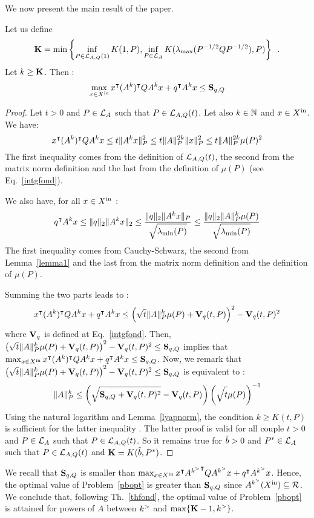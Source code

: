 \documentclass[10pt]{article}
\begin{document}
We now present the main result of the paper.
\begin{theorem}
\label{thfond}
Let us define \[\mathbf{K}=\min\left\{\inf_{P\in\mathcal{L}_{A,Q}(1)} K(1,P),\inf_{P\in\mathcal{L}_{A}} K(\lambda_{\operatorname{max}}(P^{-1/2}QP^{-1/2}),P)\right\}\enspace .\] Let $k\geq \mathbf{K}$. Then : 
\[
\max_{x\in X^\mathrm{in}} x^\intercal (A^k)^\intercal Q A^k x+q^\intercal A^k x\leq \mathbf{S}_{q,Q}
\]
\end{theorem}

\begin{proof}
Let $t>0$ and $P\in\mathcal{L}_{A}$ such that $P\in\mathcal{L}_{A,Q}(t)$. Let also $k\in\mathbb{N}$ and $x\in X^\mathrm{in}$. We have:
\[
x^\intercal (A^k)^\intercal Q A^k x  
\leq  t \| A^k x\|_P^2\leq t\| A\|^{2k}_P \| x\|^2_P
\leq t\| A\|_P^{2k} \mu(P)^2
\]
The first inequality comes from the definition of $\mathcal{L}_{A,Q}(t)$, the second from the matrix norm definition and the last from the definition of $\mu(P)$ (see Eq.~\eqref{intgfond}).

We also have, for all $x\in X^\mathrm{in}$ :
\[
q^\intercal A^k x
\leq \| q\|_2 \| A^k x\|_2\leq \dfrac{\| q\|_2 \| A^k x\|_P}{\sqrt{\strut \lambda_{\operatorname{min}}(P)}} 
\leq \dfrac{\| q\|_2\| A\|_P^{k} \mu(P)}{\sqrt{\strut \lambda_{\operatorname{min}}(P)}}
\]
The first inequality comes from Cauchy-Schwarz, the second from Lemma~\ref{lemma1} and the last from the matrix norm definition and the definition of $\mu(P)$. 

Summing the two parts leads to :
\[
x^\intercal (A^k)^\intercal Q A^k x+q^\intercal A^k x\leq \left(\sqrt{t}\| A\|_P^k\mu(P)+\mathbf{V}_{q}(t,P)\right)^2-\mathbf{V}_{q}(t,P)^2
\]
where $\mathbf{V}_{q}$ is defined at Eq.~\eqref{intgfond}. Then, $ \left(\sqrt{t}\| A\|_P^k\mu(P)+\mathbf{V}_{q}(t,P)\right)^2-\mathbf{V}_{q}(t,P)^2\leq \mathbf{S}_{q,Q}$ implies that $ \max_{x\in X^\mathrm{in}} x^\intercal (A^k)^\intercal Q A^k x+q^\intercal A^k x\leq \mathbf{S}_{q,Q}$. Now, we remark that  $\left(\sqrt{t}\| A\|_P^k\mu(P)+\mathbf{V}_{q}(t,P)\right)^2-\mathbf{V}_{q}(t,P)^2\leq \mathbf{S}_{q,Q}$ is equivalent to :
\[
\| A\|_P^k\leq \left(\sqrt{\strut \mathbf{S}_{q,Q}+\mathbf{V}_{q}(t,P)^2}-\mathbf{V}_{q}(t,P)\right)\left(\sqrt{\strut t}\mu(P)\right)^{-1}
\]
Using the natural logarithm and Lemma~\ref{lyapnorm}, the condition  $k\geq K(t,P)$ is sufficient for the latter inequality .  The latter proof is valid for all couple $t>0$ and $P\in\mathcal{L}_{A}$ such that $P\in\mathcal{L}_{A,Q}(t)$. So it remains true for   $\tilde{b}>0$ and $P^*\in\mathcal{L}_{A}$ such that $P\in\mathcal{L}_{A,Q}(t)$ and $\mathbf{K}=K(\tilde{b},P^*)$. 
\end{proof}
We recall that $\mathbf{S}_{q,Q}$ is smaller than $\max_{x\in X^\mathrm{in}} x^\intercal {A^{k^{>}}}^\intercal Q A^{k^{>}} x+q^\intercal A^{k^{>}} x$. Hence, the optimal value of Problem~\ref{pbopt} is greater than $\mathbf{S}_{q,Q}$ since $A^{k^{>}} (X^\mathrm{in})\subseteq \mathcal{R}$. We conclude that, following Th.~\ref{thfond}, the optimal value of Problem~\ref{pbopt} is attained for powers of $A$ between $k^{>}$  and $\max\{\mathbf{K}-1,k^{>}\}$.
\end{document}
